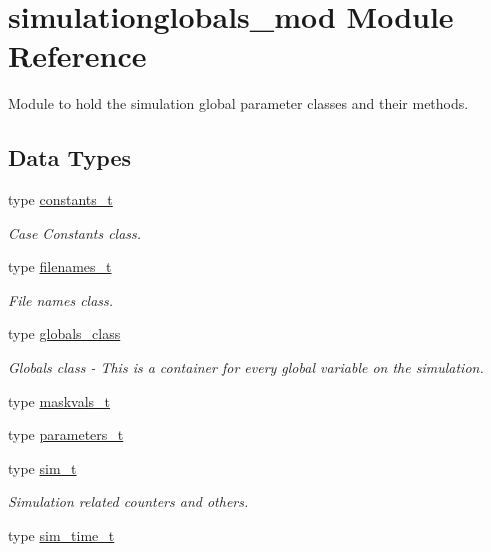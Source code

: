 \hypertarget{namespacesimulationglobals__mod}{}\section{simulationglobals\+\_\+mod Module Reference}
\label{namespacesimulationglobals__mod}


Module to hold the simulation global parameter classes and their methods.  


\subsection*{Data Types}
\begin{DoxyCompactItemize}
\item 
type \mbox{\hyperlink{structsimulationglobals__mod_1_1constants__t}{constants\+\_\+t}}
\begin{DoxyCompactList}\small\item\em Case Constants class. \end{DoxyCompactList}\item 
type \mbox{\hyperlink{structsimulationglobals__mod_1_1filenames__t}{filenames\+\_\+t}}
\begin{DoxyCompactList}\small\item\em File names class. \end{DoxyCompactList}\item 
type \mbox{\hyperlink{structsimulationglobals__mod_1_1globals__class}{globals\+\_\+class}}
\begin{DoxyCompactList}\small\item\em Globals class -\/ This is a container for every global variable on the simulation. \end{DoxyCompactList}\item 
type \mbox{\hyperlink{structsimulationglobals__mod_1_1maskvals__t}{maskvals\+\_\+t}}
\item 
type \mbox{\hyperlink{structsimulationglobals__mod_1_1parameters__t}{parameters\+\_\+t}}
\item 
type \mbox{\hyperlink{structsimulationglobals__mod_1_1sim__t}{sim\+\_\+t}}
\begin{DoxyCompactList}\small\item\em Simulation related counters and others. \end{DoxyCompactList}\item 
type \mbox{\hyperlink{structsimulationglobals__mod_1_1sim__time__t}{sim\+\_\+time\+\_\+t}}
\item 

\end{DoxyCompactItemize}
